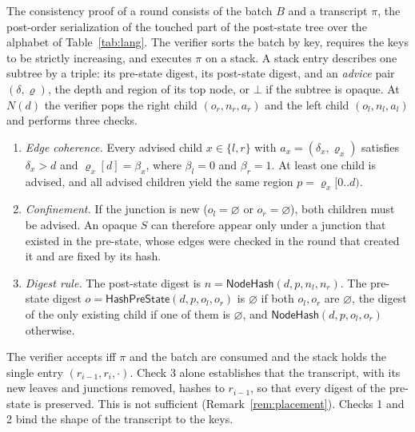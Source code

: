 \documentclass[runningheads]{llncs}
\newcommand{\NodeHash}{\mathsf{NodeHash}}
\newcommand{\PreHash}{\mathsf{HashPreState}}
\begin{document}
The consistency proof of a round consists of the batch $B$ and a transcript $\pi$, the post-order serialization of the touched part of the post-state tree over the alphabet of Table~\ref{tab:lang}. The verifier sorts the batch by key, requires the keys to be strictly increasing, and executes $\pi$ on a stack. A stack entry describes one subtree by a triple: its pre-state digest, its post-state digest, and an \emph{advice} pair $(\delta,\varrho)$, the depth and region of its top node, or $\bot$ if the subtree is opaque. At $N(d)$ the verifier pops the right child $(o_r,n_r,a_r)$ and the left child $(o_l,n_l,a_l)$ and performs three checks.
\begin{enumerate}
  \item \emph{Edge coherence.} Every advised child $x \in \{l,r\}$ with $a_x = (\delta_x,\varrho_x)$ satisfies $\delta_x > d$ and $\varrho_x[d] = \beta_x$, where $\beta_l = 0$ and $\beta_r = 1$. At least one child is advised, and all advised children yield the same region $p = \varrho_x[0..d)$.
  \item \emph{Confinement.} If the junction is new ($o_l = \varnothing$ or $o_r = \varnothing$), both children must be advised. An opaque $S$ can therefore appear only under a junction that existed in the pre-state, whose edges were checked in the round that created it and are fixed by its hash.
  \item \emph{Digest rule.} The post-state digest is $n = \NodeHash(d,p,n_l,n_r)$. The pre-state digest $o = \PreHash(d,p,o_l,o_r)$ is $\varnothing$ if both $o_l, o_r$ are $\varnothing$, the digest of the only existing child if one of them is $\varnothing$, and $\NodeHash(d,p,o_l,o_r)$ otherwise.
\end{enumerate}
The verifier accepts iff $\pi$ and the batch are consumed and the stack holds the single entry $(r_{i-1}, r_i, \cdot)$. Check 3 alone establishes that the transcript, with its new leaves and junctions removed, hashes to $r_{i-1}$, so that every digest of the pre-state is preserved. This is not sufficient (Remark~\ref{rem:placement}). Checks 1 and 2 bind the shape of the transcript to the keys.
\end{document}
